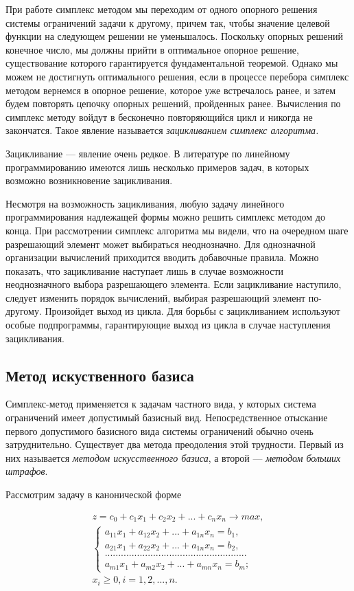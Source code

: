 При работе симплекс методом мы переходим от одного опорного решения системы ограничений задачи к другому, причем так, чтобы значение целевой функции на следующем решении не уменьшалось. Поскольку опорных решений конечное число, мы должны прийти в оптимальное опорное решение, существование которого гарантируется фундаментальной теоремой. Однако мы можем не достигнуть оптимального решения, если в процессе перебора симплекс методом вернемся в опорное решение, которое уже встречалось ранее, и затем будем повторять цепочку опорных решений, пройденных ранее. Вычисления по симплекс методу войдут в бесконечно повторяющийся цикл и никогда не закончатся. Такое явление называется \textit{зацикливанием симплекс алгоритма.}

Зацикливание — явление очень редкое. В литературе по линейному программированию имеются лишь несколько примеров задач, в которых возможно возникновение зацикливания.

Несмотря на возможность зацикливания, любую задачу линейного программирования надлежащей формы можно решить симплекс методом до конца. При рассмотрении симплекс алгоритма мы видели, что на очередном шаге разрешающий элемент может  выбираться неоднозначно. Для однозначной организации вычислений приходится вводить добавочные правила. Можно показать, что зацикливание наступает лишь в случае возможности неоднозначного выбора разрешающего элемента. Если зацикливание наступило, следует изменить порядок вычислений, выбирая разрешающий элемент по-другому. Произойдет выход из цикла. Для борьбы с зацикливанием используют особые подпрограммы, гарантирующие выход из цикла в случае наступления зацикливания.

\subsection{Метод искуственного базиса}
Симплекс-метод применяется к задачам частного вида, у которых система ограничений имеет допустимый базисный вид. Непосредственное отыскание первого допустимого базисного вида  системы ограничений обычно очень затруднительно. Существует два метода преодоления этой трудности. Первый из них называется \textit{методом искусственного базиса}, а второй — \textit{методом больших штрафов}.

Рассмотрим задачу в канонической форме

\begin{gather*}
z=c_{0}+c_{1}x_{1}+c_{2}x_{2}+...+c_{n}x_{n} \rightarrow max,\\
\begin{cases}
	a_{1 1}x_{1}+a_{1 2}x_{2}+...+a_{1 n}x_{n}=b_{1},\\
	a_{2 1}x_{1}+a_{2 2}x_{2}+...+a_{1 n}x_{n}=b_{2},\\
	 .....................................................\\
	a_{m 1}x_{1}+a_{m 2}x_{2}+...+a_{m n}x_{n}=b_{m};
\end{cases}\\
x_{i}\geq0, i=1,2,...,n.
\end{gather*}

